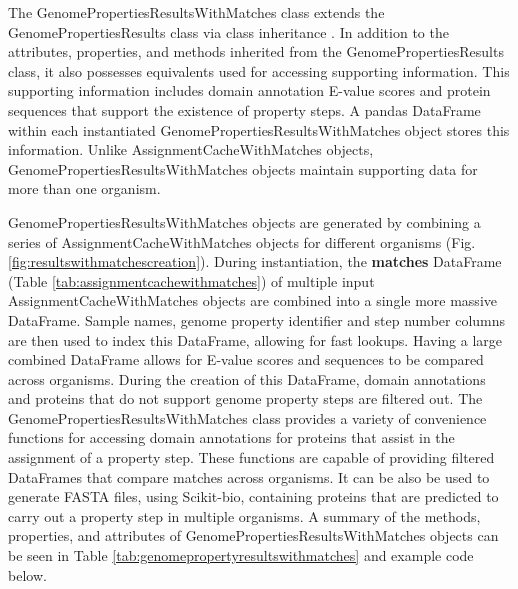 The GenomePropertiesResultsWithMatches class extends the GenomePropertiesResults class via class inheritance \cite{snyder1986encapsulation}. In addition to the attributes, properties, and methods inherited from the GenomePropertiesResults class, it also possesses equivalents used for accessing supporting information. This supporting information includes domain annotation E-value scores and protein sequences that support the existence of property steps. A pandas DataFrame within each instantiated GenomePropertiesResultsWithMatches object stores this information. Unlike AssignmentCacheWithMatches objects, GenomePropertiesResultsWithMatches objects maintain supporting data for more than one organism.

GenomePropertiesResultsWithMatches objects are generated by combining a series of AssignmentCacheWithMatches objects for different organisms (Fig. \ref{fig:resultswithmatchescreation}). During instantiation, the \textbf{matches} DataFrame (Table \ref{tab:assignmentcachewithmatches}) of multiple input AssignmentCacheWithMatches objects are combined into a single more massive DataFrame. Sample names, genome property identifier and step number columns are then used to index this DataFrame, allowing for fast lookups. Having a large combined DataFrame allows for E-value scores and sequences to be compared across organisms. During the creation of this DataFrame, domain annotations and proteins that do not support genome property steps are filtered out. The GenomePropertiesResultsWithMatches class provides a variety of convenience functions for accessing domain annotations for proteins that assist in the assignment of a property step. These functions are capable of providing filtered DataFrames that compare matches across organisms. It can be also be used to generate FASTA files, using Scikit-bio, containing proteins that are predicted to carry out a property step in multiple organisms. A summary of the methods, properties, and attributes of GenomePropertiesResultsWithMatches objects can be seen in Table \ref{tab:genomepropertyresultswithmatches} and example code below. 


